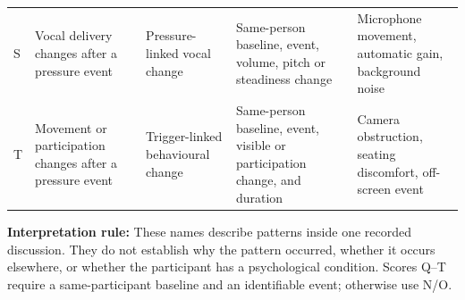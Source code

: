 \documentclass[10pt,a4paper]{article}
\begin{document}
\begin{tabularx}{\linewidth}{@{}L{8mm}L{47mm}L{39mm}L{65mm}Y@{}}
S & Vocal delivery changes after a pressure event & Pressure-linked vocal change & Same-person baseline, event, volume, pitch or steadiness change & Microphone movement, automatic gain, background noise\\
T & Movement or participation changes after a pressure event & Trigger-linked behavioural change & Same-person baseline, event, visible or participation change, and duration & Camera obstruction, seating discomfort, off-screen event\\
\bottomrule
\end{tabularx}
\endgroup

\vspace{1.5mm}
{\scriptsize\textbf{Interpretation rule:} These names describe patterns inside one recorded discussion. They do not establish why the pattern occurred, whether it occurs elsewhere, or whether the participant has a psychological condition. Scores Q--T require a same-participant baseline and an identifiable event; otherwise use N/O.}
\end{document}
